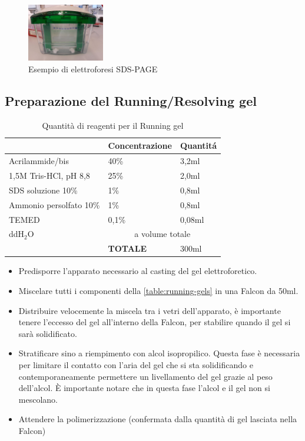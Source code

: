 \begin{figure}[H]
	\centering
	\includegraphics[width=0.3\textwidth]{./immagini/sds-page.jpg}
	\caption{Esempio di elettroforesi SDS-PAGE}
	\label{sds-page}
\end{figure}



\subsection{Preparazione del Running/Resolving gel}

\begin{table}
\begin{tabular}{|l|l|l|} \hline
	& \textbf{Concentrazione} & \textbf{Quantit\'a} \\\hline
	Acrilammide/bis & 40\% & 3,2ml \\\hline
	1,5M Tris-HCl, pH 8,8 & 25\% & 2,0ml \\\hline
	SDS soluzione 10\% & 1\% & 0,8ml \\\hline
	Ammonio persolfato 10\% & 1\% & 0,8ml \\\hline
	TEMED & 0,1\% & 0,08ml \\\hline
	ddH$_2$O & \multicolumn{2}{c|}{a volume totale} \\\hline

	& \textbf{TOTALE} & 300ml \\\hline
\end{tabular}
\caption{Quantit\`a di reagenti per il Running gel}
\label{table:running-gel}
\end{table}


\begin{itemize}
	\item Predisporre l'apparato necessario al casting del gel elettroforetico.

	\item Miscelare tutti i componenti della \ref{table:running-gels} in una Falcon da 50ml.

	\item Distribuire velocemente la miscela tra i vetri dell'apparato, \`e importante
	tenere l'eccesso del gel all'interno della Falcon, per stabilire quando il gel
	si sar\`a solidificato.

	\item Stratificare sino a riempimento con alcol isopropilico.
	Questa fase \`e necessaria per limitare il contatto con l'aria
	del gel che si sta solidificando e contemporaneamente	permettere
	un livellamento del gel grazie al peso dell'alcol.
	\`E importante notare che in questa fase l'alcol e
	il gel non si mescolano.

	\item Attendere la polimerizzazione (confermata dalla quantit\`a di
	gel lasciata nella Falcon)
\end{itemize}

